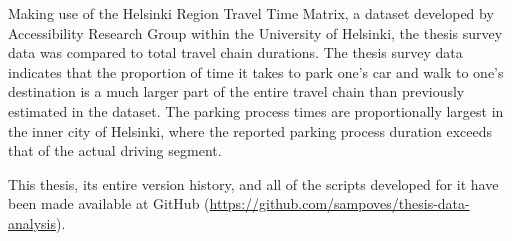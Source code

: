 Making use of the Helsinki Region Travel Time Matrix, a dataset developed by Accessibility Research Group within the University of Helsinki, the thesis survey data was compared to total travel chain durations. The thesis survey data indicates that the proportion of time it takes to park one's car and walk to one's destination is a much larger part of the entire travel chain than previously estimated in the dataset. The parking process times are proportionally largest in the inner city of Helsinki, where the reported parking process duration exceeds that of the actual driving segment.

This thesis, its entire version history, and all of the scripts developed for it have been made available at GitHub (\textcolor{blue}{\url{https://github.com/sampoves/thesis-data-analysis}}).